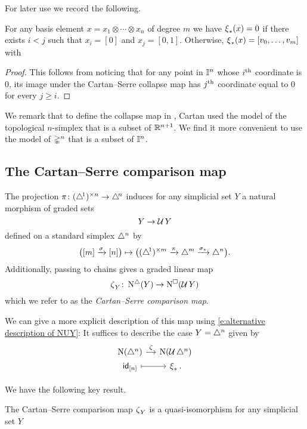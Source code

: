 For later use we record the following.
\begin{lemma} \label{l:kernel of psi}
	For any basis element $x = x_1 \otimes \cdots \otimes x_n$ of degree $m$ we have $\operatorname{\xi}_\ast(x) = 0$ if there exists $i < j$ such that $x_i = [0]$ and $x_j = [0,1]$.
	Otherwise, $\operatorname{\xi}_\ast(x) = [v_0, \dots, v_m]$ with
\end{lemma}

\begin{proof}
	This follows from noticing that for any point in $\mathbb{I}^n$ whose $i^{\mathrm{th}}$ coordinate is $0$, its image under the Cartan--Serre collapse map has $j^{\mathrm{th}}$ coordinate equal to $0$ for every $j \geq i$.
\end{proof}

We remark that to define the collapse map in \cite[p. 442]{serre1951homologie}, Cartan used the model of the topological $n$-simplex that is a subset of $\mathbb{R}^{n+1}$.
We find it more convenient to use the model of $\mathbb{\Delta}^n$ that is a subset of $\mathbb{I}^n$.

\subsection{The Cartan--Serre comparison map} \label{ss:comparison map}

The projection $\operatorname{\pi} \colon (\triangle^{\!1})^{\times n} \to \triangle^{\!n}$ induces for any simplicial set $Y$ a natural morphism of graded sets
\[
Y \to \operatorname{\mathcal{U}} Y
\]
defined on a standard simplex $\triangle^n$ by
\[
\big( [m] \xrightarrow{\sigma} [n] \big) \mapsto
\big( (\triangle^{\!1})^{\times m} \xrightarrow{\operatorname{\pi}} \triangle^m \xrightarrow{\sigma_\ast} \triangle^n \big).
\]
Additionally, passing to chains gives a graded linear map
\[
\operatorname{\zeta}_Y \colon \operatorname{N^{\triangle}}(Y) \to \operatorname{N^{\square}}(\operatorname{\mathcal{U}} Y)
\]
which we refer to as the \textit{Cartan--Serre comparison map}.

We can give a more explicit description of this map using \eqref{e:alternative description of NUY}:
It suffices to describe the case $Y = \triangle^n$ given by
\[
\begin{tikzcd}[column sep=small, row sep=0]
\chains(\simplex^n) \arrow[r, "\CScomp"] &
\chains(\cubify \simplex^n) \\
\id_{[n]} \arrow[r, mapsto] &
\CScollapse_\ast.
\end{tikzcd}
\]

We have the following key result.

\begin{lemma} \label{l:cartan serre quasi-iso}
	The Cartan--Serre comparison map $\operatorname{\zeta}_Y$ is a quasi-isomorphism for any simplicial set $Y$
\end{lemma}

